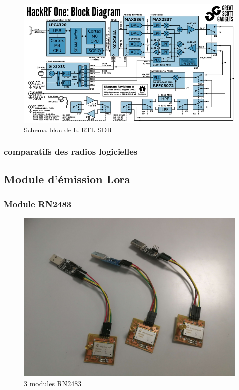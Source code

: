 \begin{figure}[h]
\centering

\includegraphics[scale=0.8]{images/SBhackrf.png}
\caption{Schema bloc de la RTL SDR\cite{SBrtlsdr}}\label{term3001}
\end{figure}

\subsubsection{comparatifs des radios logicielles}



\subsection{Module d'émission Lora}

\subsubsection{Module RN2483}

\begin{figure}[h]
\centering

\includegraphics[scale=0.08]{images/rn2483.png}
\caption{3 modules RN2483}\label{term34}
\end{figure}


